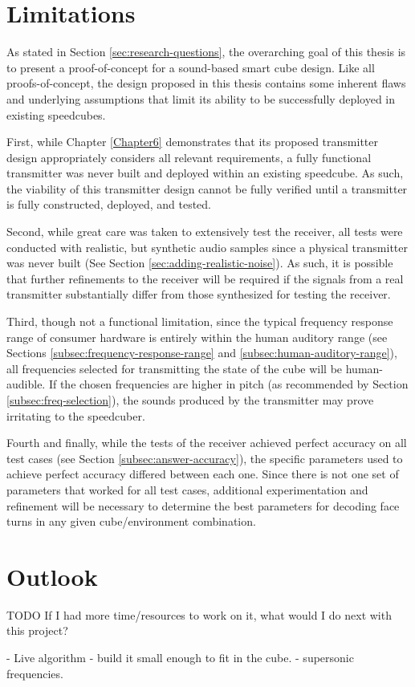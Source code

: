 \section{Limitations}
\label{sec:limitations}

As stated in Section \ref{sec:research-questions}, the overarching goal
of this thesis is to present a proof-of-concept for a sound-based smart
cube design. Like all proofs-of-concept, the design proposed in this
thesis contains some inherent flaws and underlying assumptions that limit
its ability to be successfully deployed in existing speedcubes.

First, while Chapter \ref{Chapter6} demonstrates that its proposed
transmitter design appropriately considers all relevant requirements, a
fully functional transmitter was never built and deployed within an
existing speedcube. As such, the viability of this transmitter design
cannot be fully verified until a transmitter is fully constructed,
deployed, and tested.

Second, while great care was taken to extensively test the receiver,
all tests were conducted with realistic, but synthetic audio samples
since a physical transmitter was never built (See Section
\ref{sec:adding-realistic-noise}). As such, it is possible that further
refinements to the receiver will be required if the signals from a real
transmitter substantially differ from those synthesized for testing the
receiver.

Third, though not a functional limitation, since the typical frequency
response range of consumer hardware is entirely within the human
auditory range (see Sections \ref{subsec:frequency-response-range} and
\ref{subsec:human-auditory-range}), all frequencies selected for
transmitting the state of the cube will be human-audible. If the chosen
frequencies are higher in pitch (as recommended by Section
\ref{subsec:freq-selection}), the sounds produced by the transmitter
may prove irritating to the speedcuber. 

Fourth and finally, while the tests of the receiver achieved perfect
accuracy on all test cases (see Section \ref{subsec:answer-accuracy}),
the specific parameters used to achieve perfect accuracy differed
between each one. Since there is not one set of parameters that worked
for all test cases, additional experimentation and refinement will be
necessary to determine the best parameters for decoding face turns in
any given cube/environment combination.


\section{Outlook}
\label{sec:outlook}
TODO If I had more time/resources to work on it, what would I do next
with this project?

- Live algorithm
- build it small enough to fit in the cube.
- supersonic frequencies.